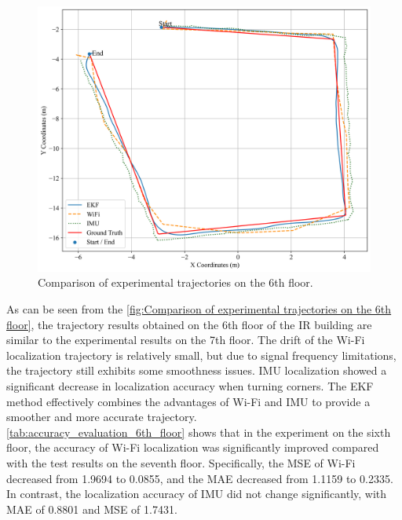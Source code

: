 \documentclass[12pt,a4paper]{article}
\numberwithin{equation}{section}
\begin{document}
\begin{figure}[H]
    \centering
    \includegraphics[width=0.7\linewidth]{images/1/4.png}
    \caption{Comparison of experimental trajectories on the 6th floor.}
    \label{fig:Comparison of experimental trajectories on the 6th floor}
\end{figure}
\noindent As can be seen from the \autoref{fig:Comparison of experimental trajectories on the 6th floor}, the trajectory results obtained on the 6th floor of the IR building are similar to the experimental results on the 7th floor. The drift of the Wi-Fi localization trajectory is relatively small, but due to signal frequency limitations, the trajectory still exhibits some smoothness issues. IMU localization showed a significant decrease in localization accuracy when turning corners. The EKF method effectively combines the advantages of Wi-Fi and IMU to provide a smoother and more accurate trajectory.\\
\autoref{tab:accuracy_evaluation_6th_floor} shows that in the experiment on the sixth floor, the accuracy of Wi-Fi localization was significantly improved compared with the test results on the seventh floor. Specifically, the MSE of Wi-Fi decreased from 1.9694 to 0.0855, and the MAE decreased from 1.1159 to 0.2335. In contrast, the localization accuracy of IMU did not change significantly, with MAE of 0.8801 and MSE of 1.7431.
\end{document}

